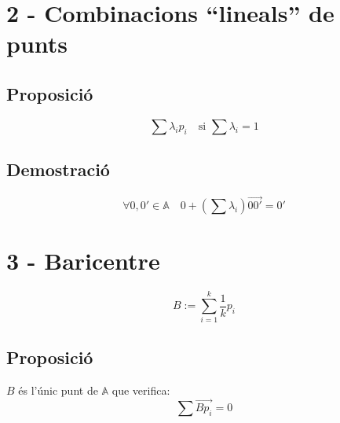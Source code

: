 \documentclass[a4paper,10pt]{article}
\newcommand{\A}{\mathbb{A}}
\begin{document}
\section{2 - Combinacions ``lineals'' de punts}
\subsection*{Proposició}
$$\sum \lambda_i p_i\quad \text{si } \sum \lambda_i = 1$$
\subsection*{Demostració}
$$\forall 0, 0' \in \A \quad 0 + \left(\sum \lambda_i\right)\overrightarrow{00'} = 0'$$

\section{3 - Baricentre}
$$B:= \sum^k_{i=1} \frac{1}{k} p_i$$
\subsection*{Proposició}
$B$ és l'únic punt de $\A$ que verifica:
$$\sum \overrightarrow{Bp_i} = 0$$
\end{document}
